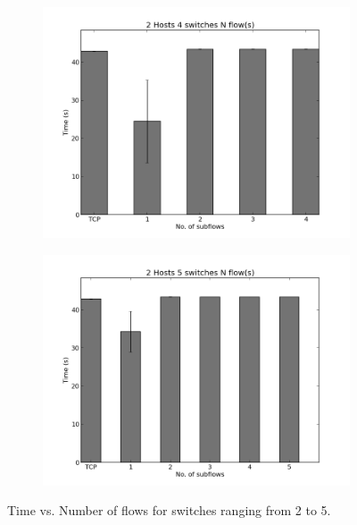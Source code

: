 \documentclass[10pt]{report}
\begin{document}
\begin{appendices}
\begin{figure}[hb]
    \begin{subfigure}[b]{0.49\textwidth}
      \includegraphics[width=\textwidth]{images/hist_sw4.png}
    \end{subfigure}
    \begin{subfigure}[b]{0.5\textwidth}
      \includegraphics[width=\textwidth]{images/hist_sw5.png}
    \end{subfigure}
    \caption{Time vs. Number of flows for switches ranging from 2 to 5.}
    \label{fig:flowvt}
  \end{figure}


\end{appendices}
\end{document}
